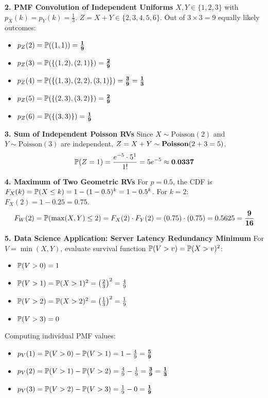 \textbf{2. PMF Convolution of Independent Uniforms}
$X, Y \in \{1, 2, 3\}$ with $p_X(k) = p_Y(k) = \frac{1}{3}$. $Z = X + Y \in \{2, 3, 4, 5, 6\}$.
Out of $3 \times 3 = 9$ equally likely outcomes:
\begin{itemize}
    \item $p_Z(2) = \P((1,1)) = \mathbf{\frac{1}{9}}$
    \item $p_Z(3) = \P(\{(1,2), (2,1)\}) = \mathbf{\frac{2}{9}}$
    \item $p_Z(4) = \P(\{(1,3), (2,2), (3,1)\}) = \mathbf{\frac{3}{9} = \frac{1}{3}}$
    \item $p_Z(5) = \P(\{(2,3), (3,2)\}) = \mathbf{\frac{2}{9}}$
    \item $p_Z(6) = \P(\{(3,3)\}) = \mathbf{\frac{1}{9}}$

\end{itemize}
\textbf{3. Sum of Independent Poisson RVs}
Since $X \sim \text{Poisson}(2)$ and $Y \sim \text{Poisson}(3)$ are independent, $Z = X + Y \sim \text{\textbf{Poisson}}(2 + 3 = 5)$.
$$\P(Z = 1) = \frac{e^{-5} \cdot 5^1}{1!} = 5 e^{-5} \approx \mathbf{0.0337}$$

\textbf{4. Maximum of Two Geometric RVs}
For $p = 0.5$, the CDF is $F_X(k) = \P(X \le k) = 1 - (1 - 0.5)^k = 1 - 0.5^k$.
For $k = 2$: $F_X(2) = 1 - 0.25 = 0.75$.
$$F_W(2) = \P(\max(X, Y) \le 2) = F_X(2) \cdot F_Y(2) = (0.75) \cdot (0.75) = 0.5625 = \mathbf{\frac{9}{16}}$$

\textbf{5. Data Science Application: Server Latency Redundancy Minimum}
For $V = \min(X, Y)$, evaluate survival function $\P(V > v) = \P(X > v)^2$:
\begin{itemize}
    \item $\P(V > 0) = 1$
    \item $\P(V > 1) = \P(X > 1)^2 = \left(\frac{2}{3}\right)^2 = \frac{4}{9}$
    \item $\P(V > 2) = \P(X > 2)^2 = \left(\frac{1}{3}\right)^2 = \frac{1}{9}$
    \item $\P(V > 3) = 0$
\end{itemize}
Computing individual PMF values:
\begin{itemize}
    \item $p_V(1) = \P(V > 0) - \P(V > 1) = 1 - \frac{4}{9} = \mathbf{\frac{5}{9}}$
    \item $p_V(2) = \P(V > 1) - \P(V > 2) = \frac{4}{9} - \frac{1}{9} = \mathbf{\frac{3}{9} = \frac{1}{3}}$
    \item $p_V(3) = \P(V > 2) - \P(V > 3) = \frac{1}{9} - 0 = \mathbf{\frac{1}{9}}$
\end{itemize}

